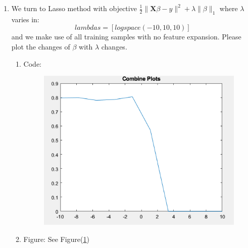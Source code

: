 \documentclass[11pt]{article}
\newcommand{\mfile}[1]  {{\small }} %
\newcommand{\mtx}[1]{\mathbf{#1}}
\newcommand{\vct}[1]{\mathbf{#1}}
\def \mU {\mtx{U}}
\def \mS {\mtx{S}}
\def \mX {\mtx{X}}
\def \vu {\vct{u}}
\begin{document}
\begin{enumerate}
\begin{enumerate}
	\end{enumerate}
\item We turn to Lasso method with objective $\frac{1}{2}\|\mX \beta-y\|^2+\lambda\|\beta\|_1$ where $\lambda$ varies in: $$lambdas=[logspace(-10,10,10)]$$ and we make use of all training samples with no feature expansion. Please plot the changes of $\beta$ with $\lambda$ changes.
\begin{enumerate}
	\item Code:\\
	\mfile{q4_5.m}
	\begin{figure}[h!]
		\centering
		\includegraphics[width=0.8\linewidth]{q45.png}
		\caption{}
		\label{fig:Q4_5}
	\end{figure}
	\item Figure: See Figure(\ref{fig:Q4_5})
\end{enumerate}
\end{enumerate}

\end{document}
